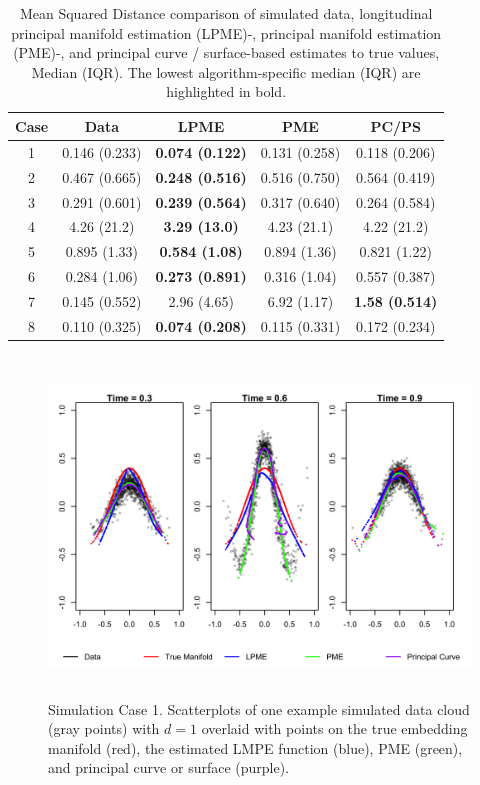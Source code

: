 \documentclass[12pt]{article}
\theoremstyle{definition}
\begin{document}
\begin{table}[h]
  \centering
  \begin{tabular}{|c c c c c|}
    \hline
    Case & Data & LPME & PME & PC/PS \\
    \hline
    1 & 0.146 (0.233) & {\bf 0.074 (0.122)} & 0.131 (0.258) & 0.118 (0.206) \\
    2 & 0.467 (0.665) & {\bf 0.248 (0.516)} & 0.516 (0.750) & 0.564 (0.419) \\
    3 & 0.291 (0.601) & {\bf 0.239 (0.564)} & 0.317 (0.640) & 0.264 (0.584) \\
    4 & 4.26 (21.2) & {\bf 3.29 (13.0)} & 4.23 (21.1) & 4.22 (21.2) \\
    5 & 0.895 (1.33) & {\bf 0.584 (1.08)} & 0.894 (1.36) & 0.821 (1.22) \\
    6 & 0.284 (1.06) & {\bf 0.273 (0.891)} & 0.316 (1.04) & 0.557 (0.387) \\
    7 & 0.145 (0.552) & 2.96 (4.65) & 6.92 (1.17) & {\bf 1.58 (0.514)} \\
    8 & 0.110 (0.325) & {\bf 0.074 (0.208)} & 0.115 (0.331) & 0.172 (0.234) \\
    \hline
  \end{tabular}
  \caption{{\footnotesize Mean Squared Distance comparison of simulated data, longitudinal principal manifold estimation (LPME)-, principal manifold estimation (PME)-, and principal curve / surface-based estimates to true values, Median (IQR). The lowest algorithm-specific median (IQR) are highlighted in bold.}}
  \label{table:simulation_results_median}
\end{table}

\begin{figure}
  \centering
  \includegraphics[height=9cm]{sim_case1} 
  \caption{{\footnotesize Simulation Case 1. Scatterplots of one example simulated data cloud (gray points) with $d=1$ overlaid with points on the true embedding manifold (red), the estimated LMPE function (blue), PME (green), and principal curve or surface (purple).}}
  \label{fig:sim_case1}
\end{figure}
\end{document}
